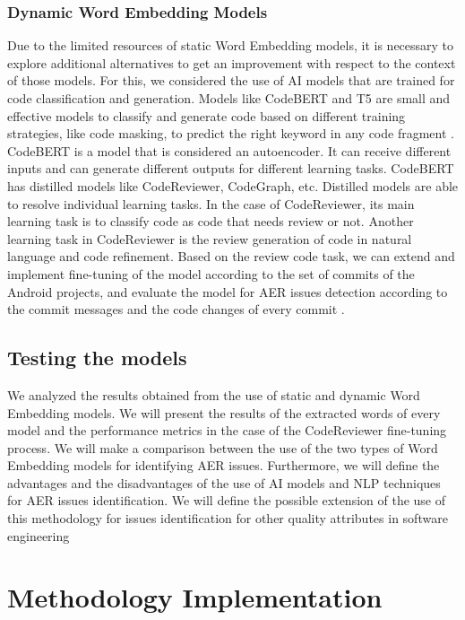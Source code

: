 \subsubsection{Dynamic Word Embedding Models}
Due to the limited resources of static Word Embedding models, it is necessary to explore additional alternatives to get an improvement with respect to the context of those models. For this, we considered the use of AI models that are trained for code classification and generation. Models like CodeBERT and T5 are small and effective models to classify and generate code based on different training strategies, like code masking, to predict the right keyword in any code fragment \cite{codebert,t5}.  
CodeBERT is a model that is considered an autoencoder. It can receive different inputs and can generate different outputs for different learning tasks. CodeBERT has distilled models like CodeReviewer, CodeGraph, etc. Distilled models are able to resolve individual learning tasks. In the case of CodeReviewer, its main learning task is to classify code as code that needs review or not. Another learning task in CodeReviewer is the review generation of code in natural language and code refinement. Based on the review code task, we can extend and implement fine-tuning of the model according to the set of commits of the Android projects, and evaluate the model for AER issues detection according to the commit messages and the code changes of every commit \cite{codereviewer, codegraph}. 



\subsection{Testing the models}
We analyzed the results obtained from the use of static and dynamic Word Embedding models. We will present the results of the extracted words of every model and the performance metrics in the case of the CodeReviewer fine-tuning process. We will make a comparison between the use of the two types of Word Embedding models for identifying AER issues. Furthermore, we will define the advantages and the disadvantages of the use of AI models and NLP techniques for AER issues identification. We will define the possible extension of the use of this methodology for issues identification for other quality attributes in software engineering 

\section{Methodology Implementation}

